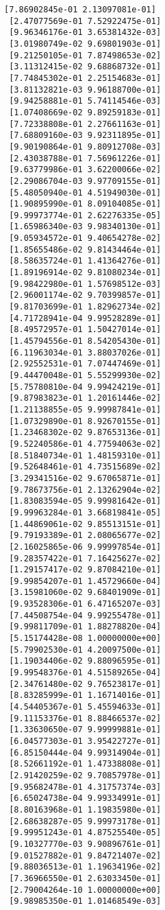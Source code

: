 \documentclass[11pt]{article}
\begin{document}
\begin{Verbatim}[commandchars=\\\{\}]
 [7.86902845e-01 2.13097081e-01]
 [2.47077569e-01 7.52922475e-01]
 [9.96346176e-01 3.65381432e-03]
 [3.01980749e-02 9.69801903e-01]
 [9.21250105e-01 7.87498653e-02]
 [3.11312415e-02 9.68868732e-01]
 [7.74845302e-01 2.25154683e-01]
 [3.81132821e-03 9.96188700e-01]
 [9.94258881e-01 5.74114546e-03]
 [1.07408669e-02 9.89259183e-01]
 [7.72338808e-01 2.27661163e-01]
 [7.68809160e-03 9.92311895e-01]
 [9.90190864e-01 9.80912708e-03]
 [2.43038788e-01 7.56961226e-01]
 [9.63779986e-01 3.62200066e-02]
 [2.29086704e-03 9.97709155e-01]
 [5.48050940e-01 4.51949030e-01]
 [1.90895990e-01 8.09104085e-01]
 [9.99973774e-01 2.62276335e-05]
 [1.65986340e-03 9.98340130e-01]
 [9.05934572e-01 9.40654278e-02]
 [1.85655486e-02 9.81434464e-01]
 [8.58635724e-01 1.41364276e-01]
 [1.89196914e-02 9.81080234e-01]
 [9.98422980e-01 1.57698512e-03]
 [2.96001174e-02 9.70399857e-01]
 [9.81703699e-01 1.82962734e-02]
 [4.71728941e-04 9.99528289e-01]
 [8.49572957e-01 1.50427014e-01]
 [1.45794556e-01 8.54205430e-01]
 [6.11963034e-01 3.88037026e-01]
 [2.92552531e-01 7.07447469e-01]
 [9.44470048e-01 5.55299930e-02]
 [5.75780810e-04 9.99424219e-01]
 [9.87983823e-01 1.20161446e-02]
 [1.21138855e-05 9.99987841e-01]
 [1.07329890e-01 8.92670155e-01]
 [1.23468302e-02 9.87653136e-01]
 [9.52240586e-01 4.77594063e-02]
 [8.51840734e-01 1.48159310e-01]
 [9.52648461e-01 4.73515689e-02]
 [3.29341516e-02 9.67065871e-01]
 [9.78673756e-01 2.13262904e-02]
 [1.83083594e-05 9.99981642e-01]
 [9.99963284e-01 3.66819841e-05]
 [1.44869061e-02 9.85513151e-01]
 [9.79193389e-01 2.08065677e-02]
 [2.16025865e-06 9.99997854e-01]
 [9.28357422e-01 7.16425627e-02]
 [1.29157417e-02 9.87084210e-01]
 [9.99854207e-01 1.45729660e-04]
 [3.15981060e-02 9.68401909e-01]
 [9.93528306e-01 6.47165207e-03]
 [7.44508754e-04 9.99255478e-01]
 [9.99811709e-01 1.88278820e-04]
 [5.15174428e-08 1.00000000e+00]
 [5.79902530e-01 4.20097500e-01]
 [1.19034406e-02 9.88096595e-01]
 [9.99548376e-01 4.51589265e-04]
 [2.34761480e-02 9.76523817e-01]
 [8.83285999e-01 1.16714016e-01]
 [4.54405367e-01 5.45594633e-01]
 [9.11153376e-01 8.88466537e-02]
 [1.33630650e-07 9.99999881e-01]
 [6.04577303e-01 3.95422727e-01]
 [6.85150444e-04 9.99314904e-01]
 [8.52661192e-01 1.47338808e-01]
 [2.91420259e-02 9.70857978e-01]
 [9.95682478e-01 4.31757374e-03]
 [6.65024738e-04 9.99334991e-01]
 [8.80163968e-01 1.19835980e-01]
 [2.68638287e-05 9.99973178e-01]
 [9.99951243e-01 4.87525540e-05]
 [9.10327770e-03 9.90896761e-01]
 [9.01527882e-01 9.84721407e-02]
 [9.88036513e-01 1.19634196e-02]
 [7.36966550e-01 2.63033450e-01]
 [2.79004264e-10 1.00000000e+00]
 [9.98985350e-01 1.01468549e-03]

\end{Verbatim}
\end{document}
